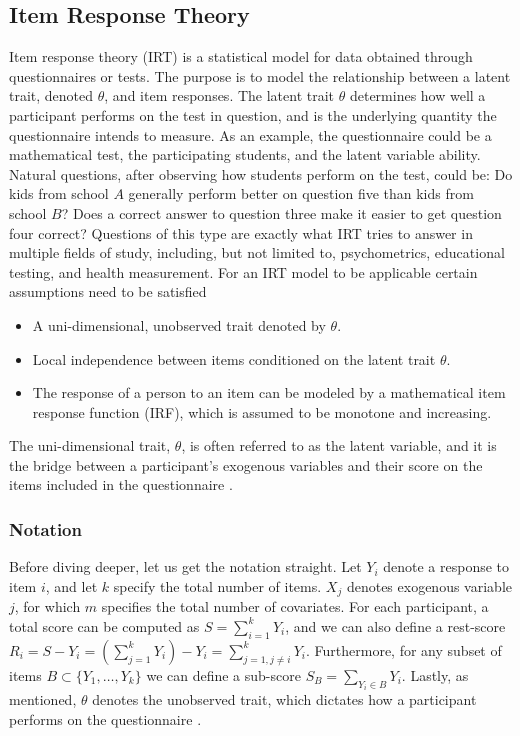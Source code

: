 \documentclass[a4project,12pt]{article}
\theoremstyle{examplestyle}
\theoremstyle{defstyle}
\theoremstyle{thmstyle}
\begin{document}
\subsection{Item Response Theory}
Item response theory (IRT) is a statistical model for data obtained through questionnaires or tests. The purpose is to model the relationship between a latent trait, denoted $\theta$, and item responses. The latent trait $\theta$ determines how well a participant performs on the test in question, and is the underlying quantity the questionnaire intends to measure.
As an example, the questionnaire could be a mathematical test, the participating students, and the latent variable ability. Natural questions, after observing how students perform on the test, could be: Do kids from school $A$ generally perform better on question five than kids from school $B$? Does a correct answer to question three make it easier to get question four correct? Questions of this type are exactly what IRT tries to answer in multiple fields of study, including, but not limited to, psychometrics, educational testing, and health measurement. For an IRT model to be applicable certain assumptions need to be satisfied
\begin{itemize}
    \item A uni-dimensional, unobserved trait denoted by $\theta$.
    \item Local independence between items conditioned on the latent trait $\theta$.
    \item The response of a person to an item can be modeled by a mathematical item response function (IRF), which is assumed to be monotone and increasing. 
\end{itemize}
The uni-dimensional trait, $\theta$, is often referred to as the latent variable, and it is the bridge between a participant's exogenous variables and their score on the items included in the questionnaire \cite{van-der-linden-hambleton}. 

\subsubsection{Notation}
Before diving deeper, let us get the notation straight. Let $Y_i$ denote a response to item $i$, and let $k$ specify the total number of items. $X_j$ denotes exogenous variable $j$, for which $m$ specifies the total number of covariates. For each participant, a total score can be computed as $S=\sum_{i=1}^k Y_i$, and we can also define a rest-score $R_i=S-Y_i=\left(\sum_{j=1}^kY_i\right)-Y_i = \sum_{j=1,j\neq i}^kY_i$. Furthermore, for any subset of items $B\subset\{Y_1,\dots,Y_k\}$ we can define a sub-score $S_B=\sum_{Y_i\in B}Y_i$. Lastly, as mentioned, $\theta$ denotes the unobserved trait, which dictates how a participant performs on the questionnaire \cite{Kreiner_Christensen_2011}. 
\end{document}
